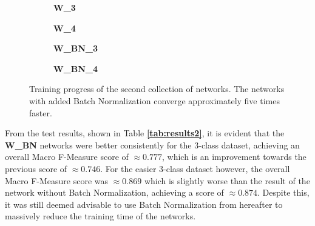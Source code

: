 \begin {figure}[!htb]
	\begin {subfigure}[b]{0.4\linewidth}
		\scalebox{0.65}{}
		\caption{\textbf{W\_3}}
	\end {subfigure}\hspace{1.75cm}
	\begin {subfigure}[b]{0.4\linewidth}
		\scalebox{0.65}{}
		\caption{\textbf{W\_4}}
	\end {subfigure}

	\begin {subfigure}[b]{0.4\linewidth}
		\scalebox{0.65}{}
		\caption{\textbf{W\_BN\_3}}
	\end {subfigure}\hspace{1.75cm}
	\begin {subfigure}[b]{0.4\linewidth}
		\scalebox{0.65}{}
		\caption{\textbf{W\_BN\_4}}
	\end {subfigure}

		\caption[Training progress of the second collection of networks.]{Training progress of the second collection of networks. The networks with added Batch Normalization converge approximately five times faster.}
		\label{fig:weighted_weighted_batchnorm_training}
\end {figure}

\noindent From the test results, shown in Table \textbf{\ref{tab:results2}}, it is evident that the \textbf{W\_BN} networks were better consistently for the 3-class dataset, achieving an overall Macro F-Measure score of $\approx0.777$, which is an improvement towards the previous score of $\approx0.746$. For the easier 3-class dataset however, the overall Macro F-Measure score was $\approx0.869$ which is slightly worse than the result of the network without Batch Normalization, achieving a score of $\approx0.874$. Despite this, it was still deemed advisable to use Batch Normalization from hereafter to massively reduce the training time of the networks.\\

